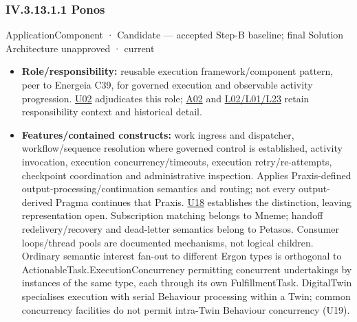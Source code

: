 \subsubsection*{IV.3.13.1.1 Ponos}
\label{navigation:IV.3.13.1.1}

\label{element:b521762c1ea444b48cd5f66be3752d30}
{\small ApplicationComponent · Candidate — accepted Step-B baseline; final Solution Architecture unapproved · current}\par

\begin{itemize}


\item \textbf{Role/responsibility:} reusable execution framework/component pattern, peer
  to Energeia C39, for governed execution and observable activity progression.
  \href{\detokenize{../../../../../../../../../docs/markdown/05-information-systems-architecture/sources.md#u02}}{U02} adjudicates this role; \href{\detokenize{../../../../../../../../../docs/markdown/05-information-systems-architecture/sources.md#a02}}{A02} and
  \href{\detokenize{../../../../../../../../../docs/markdown/05-information-systems-architecture/sources.md#l02}}{L02/L01/L23} retain responsibility context and historical detail.

\item \textbf{Features/contained constructs:} work ingress and dispatcher, workflow/sequence
  resolution where governed control is established, activity invocation, execution
  concurrency/timeouts, execution retry/re-attempts, checkpoint coordination and
  administrative inspection. Applies Praxis-defined output-processing/continuation
  semantics and routing; not every output-derived Pragma continues that Praxis.
  \href{\detokenize{../../../../../../../../../docs/markdown/05-information-systems-architecture/sources.md#u18}}{U18} establishes the distinction, leaving representation open.
  Subscription matching belongs to Mneme; handoff
  redelivery/recovery and dead-letter semantics belong to Petasos.
  Consumer loops/thread pools are documented mechanisms, not logical children.
  Ordinary semantic interest fan-out to different Ergon types is orthogonal to
  ActionableTask.ExecutionConcurrency permitting concurrent undertakings by
  instances of the same type, each through its own FulfillmentTask. DigitalTwin
  specialises execution with serial Behaviour processing within a Twin; common
  concurrency facilities do not permit intra-Twin Behaviour concurrency (U19).


\end{itemize}
